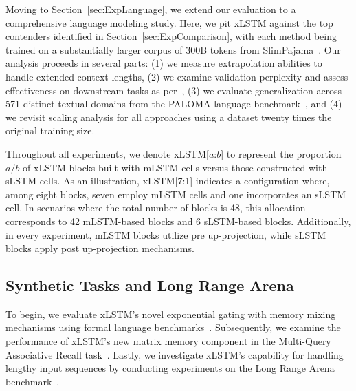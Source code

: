 Moving to Section~\ref{sec:ExpLanguage}, we extend our evaluation to a comprehensive language modeling study. Here, we pit xLSTM against the top contenders identified in Section~\ref{sec:ExpComparison}, with each method being trained on a substantially larger corpus of 300B tokens from SlimPajama~\citep{Soboleva:23}. Our analysis proceeds in several parts: (1) we measure extrapolation abilities to handle extended context lengths, (2) we examine validation perplexity and assess effectiveness on downstream tasks as per~\citep{Sutawika:24}, (3) we evaluate generalization across 571 distinct textual domains from the PALOMA language benchmark~\citep{Magnusson:23arxivshort}, and (4) we revisit scaling analysis for all approaches using a dataset twenty times the original training size.

\label{sec:xlstm_blocks_notation}
Throughout all experiments, we denote xLSTM[$a$:$b$] to represent the proportion $a/b$ of xLSTM blocks built with mLSTM cells versus those constructed with sLSTM cells. As an illustration, xLSTM[7:1] indicates a configuration where, among eight blocks, seven employ mLSTM cells and one incorporates an sLSTM cell. In scenarios where the total number of blocks is 48, this allocation corresponds to 42 mLSTM-based blocks and 6 sLSTM-based blocks. Additionally, in every experiment, mLSTM blocks utilize pre up-projection, while sLSTM blocks apply post up-projection mechanisms.

\subsection{Synthetic Tasks and Long Range Arena}
\label{sec:ExpSyntethic}
To begin, we evaluate xLSTM’s novel exponential gating with memory mixing mechanisms using formal language benchmarks~\citep{Deletang:23}. Subsequently, we examine the performance of xLSTM’s new matrix memory component in the Multi-Query Associative Recall task~\citep{Arora:23arxiv}. Lastly, we investigate xLSTM’s capability for handling lengthy input sequences by conducting experiments on the Long Range Arena benchmark~\citep{Tay:21}.

